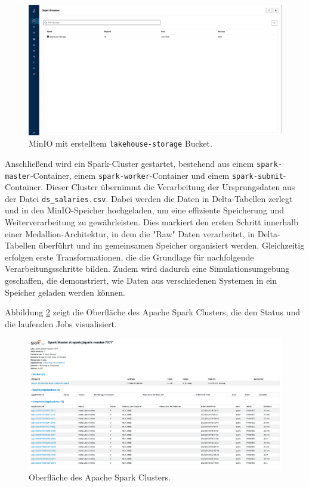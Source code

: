 \begin{figure}[H]
    \centering
    \includegraphics[width=1\linewidth]{graphics/minio.png}
    \caption[MinIO mit erstelltem lakehouse-storage Bucket]{MinIO mit erstelltem \lstinline|lakehouse-storage| Bucket.}
    \label{fig:MinIO-Bucket}
\end{figure}

Anschließend wird ein Spark-Cluster gestartet, bestehend aus einem \lstinline|spark-master|-Container, einem \lstinline|spark-worker|-Container und einem \lstinline|spark-submit|-Container. Dieser Cluster übernimmt die Verarbeitung der Ursprungsdaten aus der Datei \lstinline|ds_salaries.csv|. Dabei werden die Daten in Delta-Tabellen zerlegt und in den MinIO-Speicher hochgeladen, um eine effiziente Speicherung und Weiterverarbeitung zu gewährleisten. Dies markiert den ersten Schritt innerhalb einer Medallion-Architektur, in dem die "Raw" Daten verarbeitet, in Delta-Tabellen überführt und im gemeinsamen Speicher organisiert werden. Gleichzeitig erfolgen erste Transformationen, die die Grundlage für nachfolgende Verarbeitungsschritte bilden. Zudem wird dadurch eine Simulationsumgebung geschaffen, die demonstriert, wie Daten aus verschiedenen Systemen in ein Speicher geladen werden können.

Abbildung \ref{fig:Spark-Cluster} zeigt die Oberfläche des Apache Spark Clusters, die den Status und die laufenden Jobs visualisiert.

\begin{figure}[H]
    \centering
    \includegraphics[width=1\linewidth]{graphics/spark.png}
    \caption[Oberfläche des Apache Spark Clusters]{Oberfläche des Apache Spark Clusters.}
    \label{fig:Spark-Cluster}
\end{figure}

